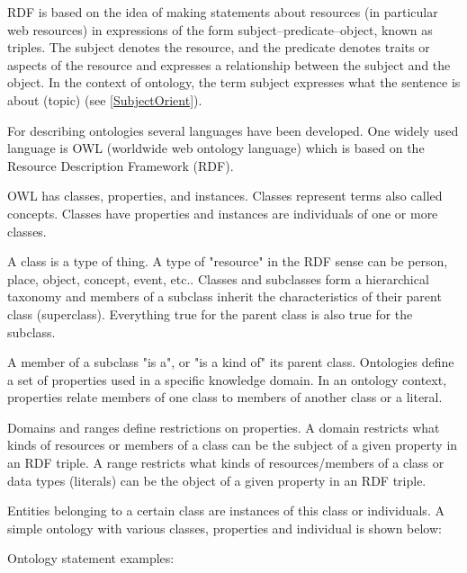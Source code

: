 RDF is based on the idea of making statements about resources (in particular web resources) in expressions of the form subject–predicate–object, known as triples. The subject denotes the resource, and the predicate denotes traits or aspects of the resource and expresses a relationship between the subject and the object. In the context of ontology, the term subject expresses what the sentence is about (topic) (see \ref{SubjectOrient}).

For describing ontologies several languages have been developed. One widely used language is OWL (worldwide web ontology language) which is based on the Resource Description Framework (RDF).

OWL has classes, properties, and instances. Classes represent terms also called concepts. Classes have properties and instances are individuals of one or more classes.

A class is a type of thing. A type of "resource" in the RDF sense can be
person, place, object, concept, event, etc.. Classes and subclasses form a hierarchical taxonomy and members of a subclass inherit the characteristics of their parent class (superclass). Everything true for the parent class is also true for the subclass.

A member of a subclass "is a", or "is a kind of" its parent class. Ontologies define a set of properties used in a specific knowledge domain. In an ontology context, properties relate members of one class to members of another class or a literal.

Domains and ranges define restrictions on properties. A domain restricts what kinds of resources or members of a class can be the subject of a given property in an RDF triple. A range restricts what kinds of resources/members of a class or data types (literals) can be the object of a given property in an RDF triple.

Entities belonging to a certain class are instances of this class or individuals. A simple ontology with various classes, properties and individual is shown below:

Ontology statement examples:

